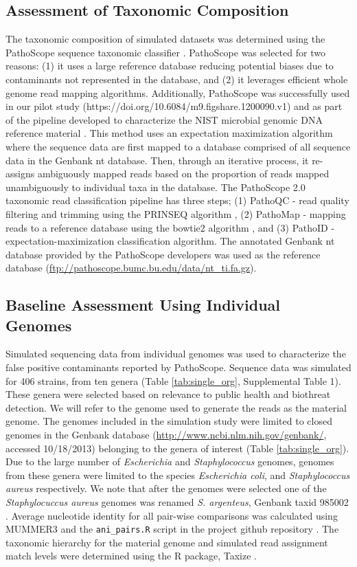 \documentclass[fleqn,10pt,lineno]{wlpeerj}\usepackage[]{graphicx}\usepackage[]{color}
\begin{document}
\subsection*{Assessment of Taxonomic Composition}
The taxonomic composition of simulated datasets was determined using the PathoScope sequence taxonomic classifier \citep{Francis2013}.
PathoScope was selected for two reasons: (1) it uses a large reference database reducing potential biases due to contaminants not represented in the database, and (2) it leverages efficient whole genome read mapping algorithms. 
Additionally, PathoScope was successfully used in our pilot study (https://doi.org/10.6084/m9.figshare.1200090.v1) and as part of the pipeline developed to characterize the NIST microbial genomic DNA reference material \citep{olson2016pepr}. 
This method uses an expectation maximization algorithm where the sequence data are first mapped to a database comprised of all sequence data in the Genbank nt database. 
Then, through an iterative process, it re-assigns ambiguously mapped reads based on the proportion of reads mapped unambiguously to individual taxa in the database. 
The PathoScope 2.0 taxonomic read classification pipeline has three steps; (1) PathoQC - read quality filtering and trimming using the PRINSEQ algorithm \citep{schmieder2011quality}, (2) PathoMap - mapping reads to a reference database using the bowtie2 algorithm \citep{Langmead2012}, and (3) PathoID - expectation-maximization classification algorithm.
The annotated Genbank nt database provided by the PathoScope developers was used as the reference database (\url{ftp://pathoscope.bumc.bu.edu/data/nt\_ti.fa.gz}).

\subsection*{Baseline Assessment Using Individual Genomes}
Simulated sequencing data from individual genomes was used to characterize the false positive contaminants reported by PathoScope.
Sequence data was simulated for 406 strains, from ten genera (Table \ref{tab:single_org}, Supplemental Table 1).
These genera were selected based on relevance to public health and biothreat detection.
We will refer to the genome used to generate the reads as the material genome.
The genomes included in the simulation study were limited to closed genomes in the Genbank database (\url{http://www.ncbi.nlm.nih.gov/genbank/}, accessed 10/18/2013) belonging to the genera of interest (Table \ref{tab:single_org}).
Due to the large number of \textit{Escherichia} and \textit{Staphylococcus} genomes, genomes from these genera were limited to the species \textit{Escherichia coli}, and \textit{Staphylococcus aureus} respectively. 
We note that after the genomes were selected one of the \textit{Staphylocuccus aureus} genomes was renamed \textit{S. argenteus}, Genbank taxid 985002 \citep{tong2015novel}. 
Average nucleotide identity for all pair-wise comparisons was calculated using MUMMER3 and the \verb|ani_pairs.R| script in the project github repository \citep{kurtz2004versatile}.
The taxonomic hierarchy for the material genome and simulated read assignment match levels were determined using the R package, Taxize \citep{TaxizeArticle,TaxizeManual}.
\end{document}
